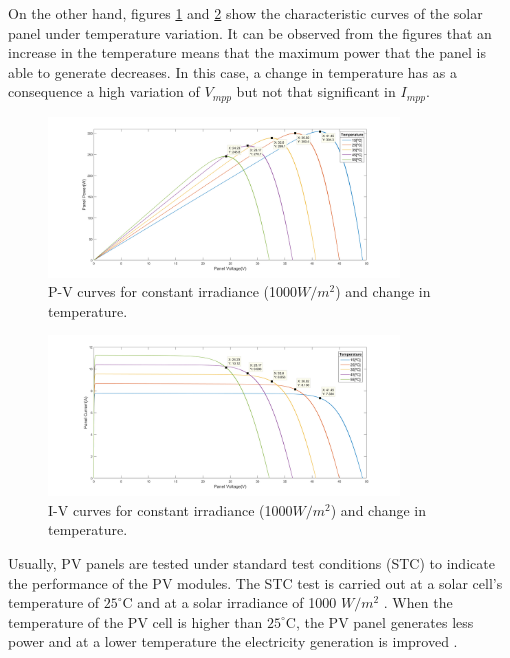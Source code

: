 On the other hand, figures \ref{fig:PVcurves_Irr1000} and \ref{fig:IVcurves_Irr1000} show the characteristic curves of the solar panel under temperature variation. It can be observed from the figures that an increase in the temperature means that the maximum power that the panel is able to generate decreases. In this case, a change in temperature has as a consequence a high variation of $V_{mpp}$ but not that significant in $I_{mpp}$.


\begin{figure}[H]
	\begin{center}
		\includegraphics[width=0.83\textwidth]{../Pictures/PV_curves_1000_irradiance}
		\caption{P-V curves for constant irradiance (1000$W/ m^2$) and change in temperature.}
		\label{fig:PVcurves_Irr1000} 
	\end{center}	
\end{figure}


\begin{figure}[H]
	\begin{center}
		\includegraphics[width=0.83\textwidth]{../Pictures/IV_curves_1000_irradiance}
		\caption{I-V curves for constant irradiance (1000$W/ m^2$) and change in temperature.}
		\label{fig:IVcurves_Irr1000} 
	\end{center}	
\end{figure}

Usually, PV panels are tested under standard test conditions (STC) to indicate the performance of the PV modules. The STC test is carried out at a solar cell's temperature of $25^\circ$C and at a solar irradiance of 1000 $W/ m^2$ \cite{handbook}. When the temperature of the PV cell is higher than $25^\circ$C, the PV panel generates less power and at a lower temperature the electricity generation is improved \cite{handbook}.


